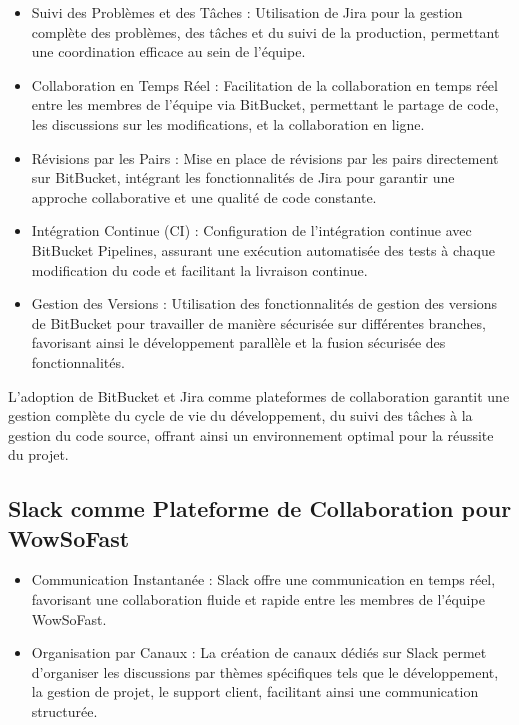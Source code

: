 {\begin{itemize}
  \item Suivi des Problèmes et des Tâches : Utilisation de Jira pour la gestion complète des problèmes, des tâches et du suivi de la production, permettant une coordination efficace au sein de l'équipe.
  
  \item Collaboration en Temps Réel : Facilitation de la collaboration en temps réel entre les membres de l'équipe via BitBucket, permettant le partage de code, les discussions sur les modifications, et la collaboration en ligne.
  
  \item Révisions par les Pairs : Mise en place de révisions par les pairs directement sur BitBucket, intégrant les fonctionnalités de Jira pour garantir une approche collaborative et une qualité de code constante.
  
  \item Intégration Continue (CI) : Configuration de l'intégration continue avec BitBucket Pipelines, assurant une exécution automatisée des tests à chaque modification du code et facilitant la livraison continue.
  
  \item Gestion des Versions : Utilisation des fonctionnalités de gestion des versions de BitBucket pour travailler de manière sécurisée sur différentes branches, favorisant ainsi le développement parallèle et la fusion sécurisée des fonctionnalités.
\end{itemize}

L'adoption de BitBucket et Jira comme plateformes de collaboration garantit une gestion complète du cycle de vie du développement, du suivi des tâches à la gestion du code source, offrant ainsi un environnement optimal pour la réussite du projet.

\subsection{Slack comme Plateforme de Collaboration pour WowSoFast}

\begin{itemize}
  \item Communication Instantanée : Slack offre une communication en temps réel, favorisant une collaboration fluide et rapide entre les membres de l'équipe WowSoFast.

  \item Organisation par Canaux : La création de canaux dédiés sur Slack permet d'organiser les discussions par thèmes spécifiques tels que le développement, la gestion de projet, le support client, facilitant ainsi une communication structurée.


\end{itemize}}
